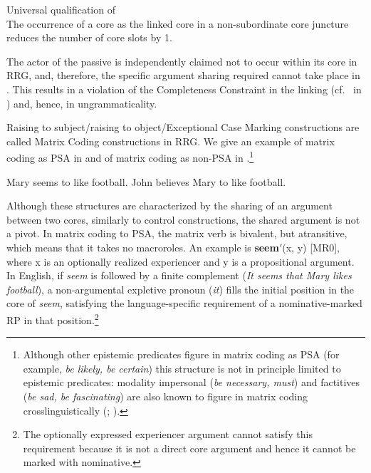 \documentclass[output=paper,hidelinks]{langscibook}
\begin{document}
\ea%
   \label{ex:RRG:29} Universal qualification of \\
   The occurrence of a core as the linked core in a non-subordinate core juncture reduces the number of core slots by 1.
   \z

\newpage
\noindent The actor of the passive is independently claimed not to occur within its core in RRG, and, therefore, the specific argument sharing required cannot take place in . This results in a violation of the Completeness Constraint in the linking (cf.\  in ) and, hence, in ungrammaticality.

Raising to subject/raising to object/Exceptional Case Marking constructions are called Matrix Coding constructions in RRG. We give an example of matrix coding as PSA in  and of matrix coding as non-PSA in .\footnote{Although other epistemic predicates figure in matrix coding as PSA (for example, \textit{be likely, be certain}) this structure is not in principle limited to epistemic predicates: modality impersonal (\textit{be necessary, must}) and factitives (\textit{be sad, be fascinating}) are also known to figure in matrix coding crosslinguistically (\citealt{Kimenyi1980}; \citealt{Bentley2003}).}

\ea%
   \label{ex:RRG:30}
   \ea\label{ex:RRG:30a} Mary seems to like football.
   \ex\label{ex:RRG:30b} John believes Mary to like football.
   \z\z

Although these structures are characterized by the sharing of an argument between two cores, similarly to control constructions, the shared argument is not a pivot. In matrix coding to PSA, the matrix verb is bivalent, but atransitive, which means that it takes no macroroles. An example is \textbf{seem$'$}(x, y) [MR0], where x is an optionally realized experiencer and y is a propositional argument. In English, if \textit{seem} is followed by a finite complement (\textit{It seems that Mary likes football}), a non-argumental expletive pronoun (\textit{it}) fills the initial position in the core of \textit{seem}, satisfying the language-specific requirement of a nominative-marked RP in that position.\footnote{The optionally expressed experiencer argument cannot satisfy this requirement because it is not a direct core argument and hence it cannot be marked with nominative.}
\end{document}

